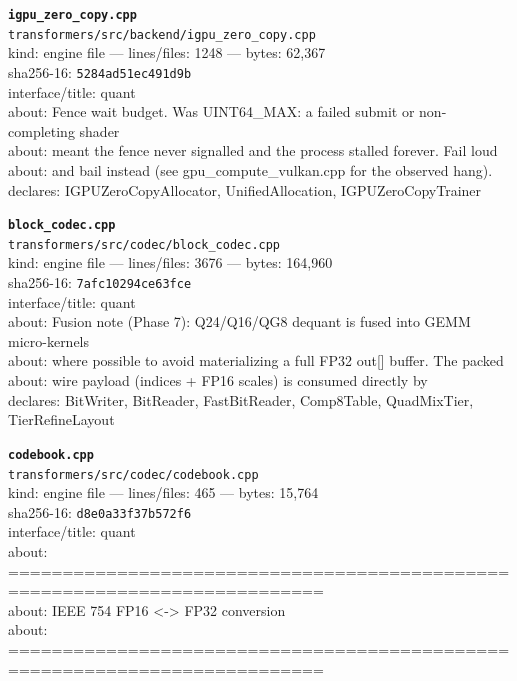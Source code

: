\noindent\textbf{\texttt{igpu\_zero\_copy.cpp}}\\
\texttt{transformers/src/backend/igpu\_zero\_copy.cpp}\\
kind: engine file --- lines/files: 1248 --- bytes: 62,367\\
sha256-16: \texttt{5284ad51ec491d9b}\\
interface/title: quant\\
about: Fence wait budget. Was UINT64\_MAX: a failed submit or non-completing shader\\
about: meant the fence never signalled and the process stalled forever. Fail loud\\
about: and bail instead (see gpu\_compute\_vulkan.cpp for the observed hang).\\
declares: IGPUZeroCopyAllocator, UnifiedAllocation, IGPUZeroCopyTrainer\\
\vspace*{6.0pt}
\newpage

\noindent\textbf{\texttt{block\_codec.cpp}}\\
\texttt{transformers/src/codec/block\_codec.cpp}\\
kind: engine file --- lines/files: 3676 --- bytes: 164,960\\
sha256-16: \texttt{7afc10294ce63fce}\\
interface/title: quant\\
about: Fusion note (Phase 7): Q24/Q16/QG8 dequant is fused into GEMM micro-kernels\\
about: where possible to avoid materializing a full FP32 out[] buffer. The packed\\
about: wire payload (indices + FP16 scales) is consumed directly by\\
declares: BitWriter, BitReader, FastBitReader, Comp8Table, QuadMixTier, TierRefineLayout\\
\vspace*{6.0pt}

\noindent\textbf{\texttt{codebook.cpp}}\\
\texttt{transformers/src/codec/codebook.cpp}\\
kind: engine file --- lines/files: 465 --- bytes: 15,764\\
sha256-16: \texttt{d8e0a33f37b572f6}\\
interface/title: quant\\
about: ===========================================================================\\
about: IEEE 754 FP16 <-> FP32 conversion\\
about: ===========================================================================\\
\vspace*{6.0pt}

